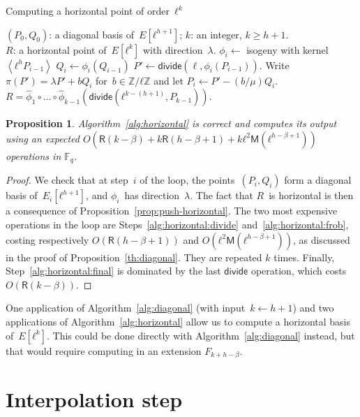 \documentclass{lms}
\newtheorem{prop}[thm]{Proposition}
\def\chev#1{\left\langle#1\right\rangle}
\def\cout#1{\mathsf{#1}}
\def\sfdiv{\mathsf{divide}}
\newcommand{\F}{\mathbb{F}}
\newcommand{\MM}{\cout{M}}
\newcommand{\RR}{\cout{R}}
\begin{document}
\begin{algorithm}
\caption{\label{alg:horizontal}Computing a horizontal point of order~$ℓ^k$}
\begin{algorithmic}[1]
\REQUIRE $(P_0, Q_0)$: a diagonal basis of~$E[ℓ^{h+1}]$; $k$: an integer,
$k ≥ h + 1$.\\
\ENSURE $R$: a horizontal point of~$E[ℓ^k]$ with direction~$λ$.
\STATE $ϕ_i \gets $ isogeny with kernel~$\chev{ℓ^{h} P_{i-1}}$
\STATE $Q_{i} \gets ϕ_i(Q_{i-1})$
\STATE\label{alg:horizontal:divide} $P' \gets \sfdiv(\ell, ϕ_i(P_{i-1}))$.
\STATE\label{alg:horizontal:frob} Write~$π(P') = λ P' + b Q_i$ for~$b ∈ ℤ/ℓℤ$ and
let $P_{i} \gets P' - (b/μ) Q_i$.
\ENDFOR
\RETURN\label{alg:horizontal:final} $R = \widehat{ϕ}_1 ∘ … ∘ \widehat{ϕ}_{k-1}
  (\sfdiv( ℓ^{k-(h+1)}, P_{k-1}) )$. 
\end{algorithmic}
\end{algorithm}
\begin{prop}\label{th:horizontal}
  Algorithm~\ref{alg:horizontal} is correct and computes its output
  using an expected $O(\RR(k-\beta) + k\RR(h-β+1) + kℓ^2\MM(ℓ^{h-β+1}))$
  operations in $\F_q$.
\end{prop}
\begin{proof}
We check that at step~$i$ of the loop,
the points~$(P_i, Q_i)$ form a diagonal basis of~$E_i[ℓ^{h+1}]$,
and $ϕ_i$~has direction~$λ$.
The fact that $R$~is horizontal is then a consequence
of Proposition~\ref{prop:push-horizontal}.
The two most expensive operations in the loop are
Steps~\ref{alg:horizontal:divide} and~\ref{alg:horizontal:frob},
costing respectively $O(\RR(h-β+1))$ and $O(ℓ^2\MM(ℓ^{h-β+1}))$, as
discussed in the proof of Proposition~\ref{th:diagonal}. They are
repeated $k$ times. Finally, Step~\ref{alg:horizontal:final} is
dominated by the last $\sfdiv$ operation, which costs $O(\RR(k-β))$.
\end{proof}

One application of Algorithm~\ref{alg:diagonal} (with input~$k ← h+1$)
and two applications of Algorithm~\ref{alg:horizontal} allow us
to compute a horizontal basis of~$E[ℓ^k]$.
This could be done directly with Algorithm~\ref{alg:diagonal} instead,
but that would require computing in an extension $F_{k+h-\beta}$.



\section{Interpolation step}
\label{sec:interpolation}
\end{document}
